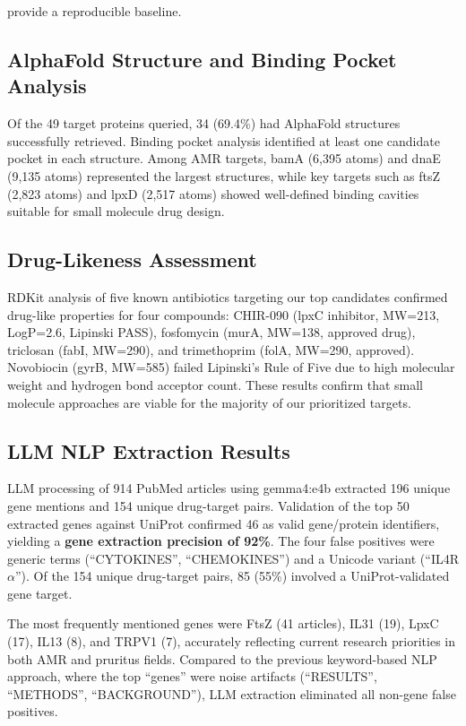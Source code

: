\documentclass[12pt,a4paper]{article}
\begin{document}
provide a reproducible baseline.

\subsection{AlphaFold Structure and Binding Pocket Analysis}
Of the 49 target proteins queried, 34 (69.4\%) had AlphaFold structures successfully retrieved. Binding pocket analysis identified at least one candidate pocket in each structure. Among AMR targets, bamA (6,395 atoms) and dnaE (9,135 atoms) represented the largest structures, while key targets such as ftsZ (2,823 atoms) and lpxD (2,517 atoms) showed well-defined binding cavities suitable for small molecule drug design.

\subsection{Drug-Likeness Assessment}
RDKit analysis of five known antibiotics targeting our top candidates confirmed drug-like properties for four compounds: CHIR-090 (lpxC inhibitor, MW=213, LogP=2.6, Lipinski PASS), fosfomycin (murA, MW=138, approved drug), triclosan (fabI, MW=290), and trimethoprim (folA, MW=290, approved). Novobiocin (gyrB, MW=585) failed Lipinski's Rule of Five due to high molecular weight and hydrogen bond acceptor count. These results confirm that small molecule approaches are viable for the majority of our prioritized targets.

\subsection{LLM NLP Extraction Results}
LLM processing of 914 PubMed articles using gemma4:e4b extracted 196 unique gene mentions and 154 unique drug-target pairs. Validation of the top 50 extracted genes against UniProt confirmed 46 as valid gene/protein identifiers, yielding a \textbf{gene extraction precision of 92\%}. The four false positives were generic terms (``CYTOKINES'', ``CHEMOKINES'') and a Unicode variant (``IL4R$\alpha$''). Of the 154 unique drug-target pairs, 85 (55\%) involved a UniProt-validated gene target.

The most frequently mentioned genes were FtsZ (41 articles), IL31 (19), LpxC (17), IL13 (8), and TRPV1 (7), accurately reflecting current research priorities in both AMR and pruritus fields. Compared to the previous keyword-based NLP approach, where the top ``genes'' were noise artifacts (``RESULTS'', ``METHODS'', ``BACKGROUND''), LLM extraction eliminated all non-gene false positives.
\end{document}
